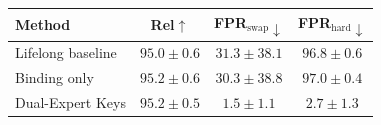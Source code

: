 \documentclass[letterpaper]{article} %
\begin{document}
\begin{center}
\small
\begin{tabular}{@{}lccc@{}}
\toprule
Method & Rel$\uparrow$ & FPR$_{\mathrm{swap}}\downarrow$ & FPR$_{\mathrm{hard}}\downarrow$ \\
\midrule
Lifelong baseline & $95.0{\pm}0.6$ & $31.3{\pm}38.1$ & $96.8{\pm}0.6$ \\
Binding only & $95.2{\pm}0.6$ & $30.3{\pm}38.8$ & $97.0{\pm}0.4$ \\
Dual-Expert Keys & $\mathbf{95.2{\pm}0.5}$ & $\mathbf{1.5{\pm}1.1}$ & $\mathbf{2.7{\pm}1.3}$ \\
\bottomrule
\end{tabular}
\label{tab:evqa}
\end{center}



\end{document}
